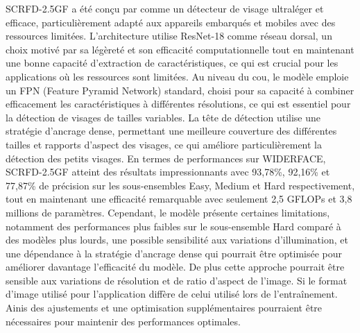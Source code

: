 \begin{onehalfspace}
\hspace{0.65cm} SCRFD-2.5GF a été conçu par \cite{Guo2021SampleAC} comme un détecteur de visage ultraléger et efficace, particulièrement adapté aux appareils embarqués et mobiles avec des ressources limitées. L'architecture utilise ResNet-18 comme réseau dorsal, un choix motivé par sa légèreté et son efficacité computationnelle tout en maintenant une bonne capacité d'extraction de caractéristiques, ce qui est crucial pour les applications où les ressources sont limitées. Au niveau du cou, le modèle emploie un FPN (Feature Pyramid Network) standard, choisi pour sa capacité à combiner efficacement les caractéristiques à différentes résolutions, ce qui est essentiel pour la détection de visages de tailles variables. La tête de détection utilise une stratégie d'ancrage dense, permettant une meilleure couverture des différentes tailles et rapports d'aspect des visages, ce qui améliore particulièrement la détection des petits visages. En termes de performances sur WIDERFACE, SCRFD-2.5GF atteint des résultats impressionnants avec 93,78\%, 92,16\% et 77,87\% de précision sur les sous-ensembles Easy, Medium et Hard respectivement, tout en maintenant une efficacité remarquable avec seulement 2,5 GFLOPs et 3,8 millions de paramètres. Cependant, le modèle présente certaines limitations, notamment des performances plus faibles sur le sous-ensemble Hard comparé à des modèles plus lourds, une possible sensibilité aux variations d'illumination, et une dépendance à la stratégie d'ancrage dense qui pourrait être optimisée pour améliorer davantage l'efficacité du modèle. De plus cette approche pourrait être sensible aux variations de résolution et de ratio d'aspect de l'image. Si le format d'image utilisé pour l'application diffère de celui utilisé lors de l'entraînement. Ainis des ajustements et une optimisation supplémentaires pourraient être nécessaires pour maintenir des performances optimales.



\end{onehalfspace}

